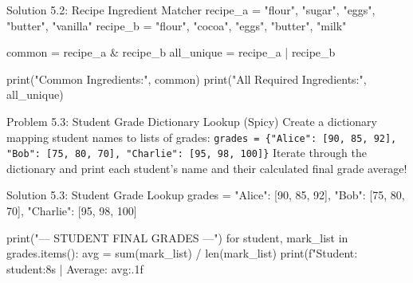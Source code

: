 \begin{pycode}{Solution 5.2: Recipe Ingredient Matcher}
recipe_a = {"flour", "sugar", "eggs", "butter", "vanilla"}
recipe_b = {"flour", "cocoa", "eggs", "butter", "milk"}

common = recipe_a & recipe_b
all_unique = recipe_a | recipe_b

print("Common Ingredients:", common)
print("All Required Ingredients:", all_unique)
\end{pycode}

\begin{snakelab}{Problem 5.3: Student Grade Dictionary Lookup (Spicy)}
Create a dictionary mapping student names to lists of grades:
\texttt{grades = \{"Alice": [90, 85, 92], "Bob": [75, 80, 70], "Charlie": [95, 98, 100]\}}
Iterate through the dictionary and print each student's name and their calculated final grade average!
\end{snakelab}

\begin{pycode}{Solution 5.3: Student Grade Lookup}
grades = {
    "Alice": [90, 85, 92],
    "Bob": [75, 80, 70],
    "Charlie": [95, 98, 100]
}

print("--- STUDENT FINAL GRADES ---")
for student, mark_list in grades.items():
    avg = sum(mark_list) / len(mark_list)
    print(f"Student: {student:8s} | Average: {avg:.1f}%
\end{pycode}
